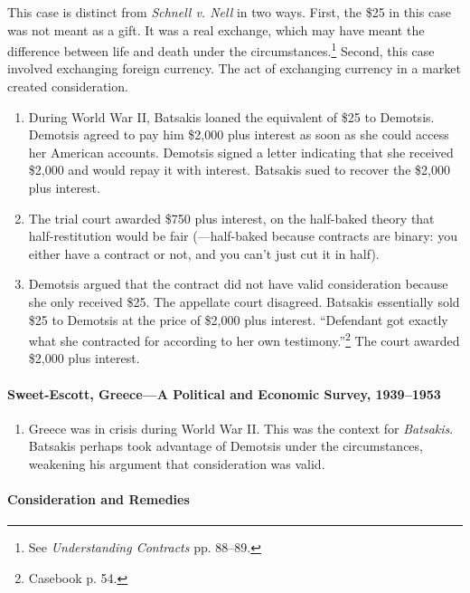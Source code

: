 This case is distinct from \emph{Schnell v. Nell} in two ways. First, the \$25 
in this case was not meant as a gift. It was a real exchange, which may have 
meant the difference between life and death under the 
circumstances.\footnote{See \emph{Understanding Contracts} pp. 88--89.} 
Second, this case involved exchanging foreign currency. The act of exchanging 
currency in a market created consideration.

\begin{enumerate}
    \item During World War II, Batsakis loaned the equivalent of \$25 to 
    Demotsis. Demotsis agreed to pay him \$2,000 plus interest as soon as she 
    could access her American accounts. Demotsis signed a letter indicating 
    that she received \$2,000 and would repay it with interest. Batsakis sued 
    to recover the \$2,000 plus interest.
    \item The trial court awarded \$750 plus interest, on the half-baked 
    theory that half-restitution would be fair (---half-baked because 
    contracts are binary: you either have a contract or not, and you can't 
    just cut it in half).
    \item Demotsis argued that the contract did not have valid consideration 
    because she only received \$25. 
    The appellate court disagreed.  Batsakis essentially sold \$25 to Demotsis 
    at the price of \$2,000 plus interest. ``Defendant got exactly what she 
    contracted for according to her own testimony.''\footnote{Casebook p. 54.} 
    The court awarded \$2,000 plus interest.
\end{enumerate}

\paragraph{Sweet-Escott, Greece---A Political and Economic Survey, 
1939--1953}

\begin{enumerate}
    \item Greece was in crisis during World War II. This was the context for 
    \emph{Batsakis}. Batsakis perhaps took advantage of Demotsis under the 
    circumstances, weakening his argument that consideration was valid.
\end{enumerate}

\paragraph{Consideration and Remedies}

